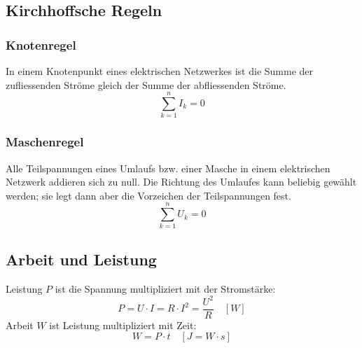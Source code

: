 \subsection{Kirchhoffsche Regeln}

\subsubsection{Knotenregel}

In einem Knotenpunkt eines elektrischen Netzwerkes ist die Summe der
zufliessenden Ströme gleich der Summe der abfliessenden Ströme.
\[
	\sum_{k=1}^n I_k = 0
\]

\subsubsection{Maschenregel}

Alle Teilspannungen eines Umlaufs bzw. einer Masche in einem elektrischen
Netzwerk addieren sich zu null. Die Richtung des Umlaufes kann beliebig gewählt
werden; sie legt dann aber die Vorzeichen der Teilspannungen fest.
\[
	\sum_{k=1}^n U_k = 0
\]

\subsection{Arbeit und Leistung}

Leistung $P$ ist die Spannung multipliziert mit der Stromstärke:
\[
	P = U \cdot I = R \cdot I^2 = \frac{U^2}{R}
	\quad \left[ W \right]
\]
Arbeit $W$ ist Leistung multipliziert mit Zeit:
\[
	W = P \cdot t
	\quad \left[ J = W \cdot s \right]
\]
